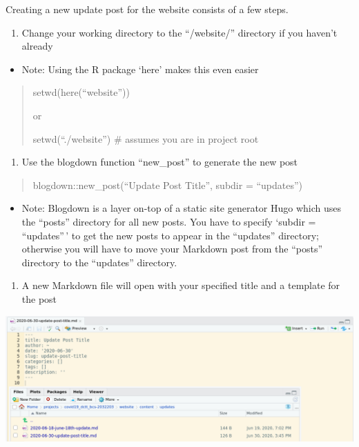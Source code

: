 \documentclass[
]{book}
\providecommand{\tightlist}{%
  \setlength{\itemsep}{0pt}\setlength{\parskip}{0pt}}
\begin{document}
Creating a new update post for the website consists of a few steps.

\begin{enumerate}
\def\labelenumi{\arabic{enumi}.}
\tightlist
\item
  Change your working directory to the ``/website/'' directory if you haven't already
\end{enumerate}

\begin{itemize}
\tightlist
\item
  Note: Using the R package `here' makes this even easier
\end{itemize}

\begin{quote}
setwd(here(``website''))

or

setwd(``./website'') \# assumes you are in project root
\end{quote}

\begin{enumerate}
\def\labelenumi{\arabic{enumi}.}
\setcounter{enumi}{1}
\tightlist
\item
  Use the blogdown function ``new\_post'' to generate the new post
\end{enumerate}

\begin{quote}
blogdown::new\_post(``Update Post Title'', subdir = ``updates'')
\end{quote}

\begin{itemize}
\tightlist
\item
  Note: Blogdown is a layer on-top of a static site generator Hugo which uses the ``posts'' directory for all new posts. You have to specify `subdir = ``updates''\,' to get the new posts to appear in the ``updates'' directory; otherwise you will have to move your Markdown post from the ``posts'' directory to the ``updates'' directory.
\end{itemize}

\begin{enumerate}
\def\labelenumi{\arabic{enumi}.}
\setcounter{enumi}{1}
\tightlist
\item
  A new Markdown file will open with your specified title and a template for the post
\end{enumerate}

\includegraphics{images/04-newpost_1.png}
\end{document}
